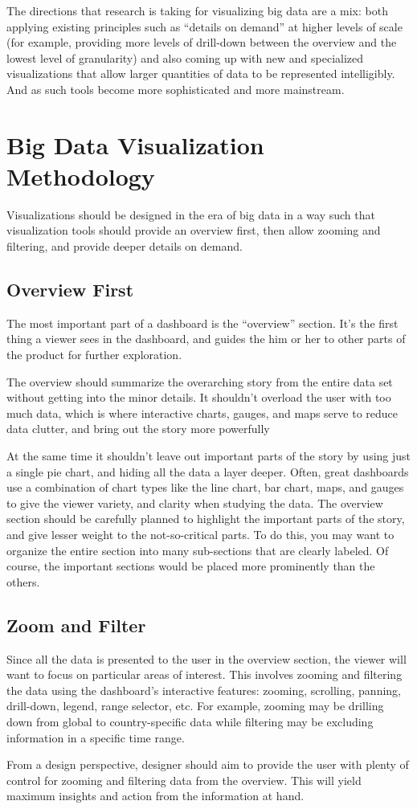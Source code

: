 The directions that research is taking for visualizing big data are a mix: both applying existing principles such as “details on demand” at higher levels of scale (for example, providing more levels of drill-down between the overview and the lowest level of granularity) and also coming up with new and specialized visualizations that allow larger quantities of data to be represented intelligibly. And as such tools become more sophisticated and more mainstream.
\section{Big Data Visualization Methodology}
Visualizations should be designed in the era of big data in a way such that visualization tools should provide an overview first, then allow zooming and filtering, and provide deeper details on demand.
\subsection{Overview First}
The most important part of a dashboard is the “overview” section. It’s the first thing a viewer sees in the dashboard, and guides the him or her to other parts of the product for further exploration.
\par
The overview should summarize the overarching story from the entire data set without getting into the minor details. It shouldn’t overload the user with too much data, which is where interactive charts, gauges, and maps serve to reduce data clutter, and bring out the story more powerfully
\par
At the same time it shouldn’t leave out important parts of the story by using just a single pie chart, and hiding all the data a layer deeper. Often, great dashboards use a combination of chart types like the line chart, bar chart, maps, and gauges to give the viewer variety, and clarity when studying the data. The overview section should be carefully planned to highlight the important parts of the story, and give lesser weight to the not-so-critical parts. To do this, you may want to organize the entire section into many sub-sections that are clearly labeled. Of course, the important sections would be placed more prominently than the others.
\subsection{Zoom and Filter}
Since all the data is presented to the user in the overview section, the viewer will want to focus on particular areas of interest. This involves zooming and filtering the data using the dashboard’s interactive features: zooming, scrolling, panning, drill-down, legend, range selector, etc. For example, zooming may be drilling down from global to country-specific data while filtering may be excluding information in a specific time range.
\par 
From a design perspective, designer should aim to provide the user with plenty of control for zooming and filtering data from the overview. This will yield maximum insights and action from the information at hand.
